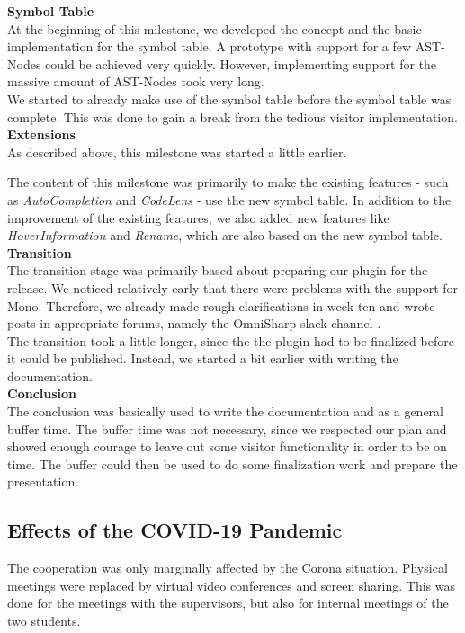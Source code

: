 {\bf Symbol Table}\\
At the beginning of this milestone,
we developed the concept and the basic implementation for the symbol table.
A prototype with support for a few AST-Nodes could be achieved very quickly.
However, implementing support for the massive amount of AST-Nodes took very long.\\

We started to already make use of the symbol table before the symbol table was complete.
This was done to gain a break from the tedious visitor implementation.\\

{\bf Extensions}\\
As described above, this milestone was started a little earlier.

The content of this milestone was primarily to make the existing features
- such as \textit{AutoCompletion} and \textit{CodeLens} -
use the new symbol table.
In addition to the improvement of the existing features, we also
added new features like \textit{HoverInformation} and \textit{Rename},
which are also based on the new symbol table.\\

{\bf Transition}\\
The transition stage was primarily based about preparing our plugin for the release.
We noticed relatively early that there were problems with the support for Mono.
Therefore, we already made rough clarifications in week ten and wrote posts in appropriate forums,
namely the OmniSharp slack channel \cite{mono-slack}.\\

The transition took a little longer, since the the plugin had to be finalized before it could be published.
Instead, we started a bit earlier with writing the documentation.\\

{\bf Conclusion}\\
The conclusion was basically used to write the documentation and as a general buffer time.
The buffer time was not necessary, since we respected our plan and showed enough courage to leave out some visitor functionality in order to be on time.
The buffer could then be used to do some finalization work and prepare the presentation.\\

\subsection{Effects of the COVID-19 Pandemic}
The cooperation was only marginally affected by the Corona situation.
Physical meetings were replaced by virtual video conferences and screen sharing.
This was done for the meetings with the supervisors, but also for internal meetings of the two students.


